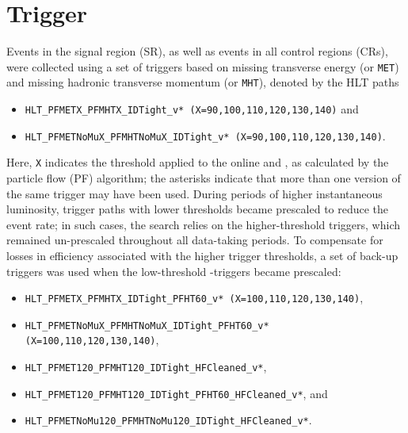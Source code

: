 \clearpage
\section{Trigger}
\label{sec:trigger}

Events in the signal region (SR), as well as events in all control regions (CRs), were collected using a set of triggers based on missing transverse energy \MET (or {\tt MET}) and missing hadronic transverse momentum \mht (or {\tt MHT}), denoted by the HLT paths 

\begin{itemize}
\item
  \texttt{HLT\_PFMETX\_PFMHTX\_IDTight\_v* (X=90,100,110,120,130,140)} and
\item \texttt{HLT\_PFMETNoMuX\_PFMHTNoMuX\_IDTight\_v* (X=90,100,110,120,130,140)}.
\end{itemize}

Here, \texttt{X} indicates the threshold applied to the online
\MET and \mht, as calculated by the particle flow (PF) algorithm; the
asterisks indicate that more than one version of the same trigger may
have been used.  During periods of higher instantaneous luminosity,
trigger paths with lower thresholds  became prescaled to reduce the
event rate; in such cases, the search relies on the higher-threshold
triggers, which remained un-prescaled throughout all data-taking periods. 
To compensate for losses in efficiency associated with the higher trigger thresholds,  
a set of back-up triggers was used when the  low-threshold \MET-\mht triggers 
became prescaled:

\begin{itemize}
\item \texttt{HLT\_PFMETX\_PFMHTX\_IDTight\_PFHT60\_v* (X=100,110,120,130,140)},
\item \texttt{HLT\_PFMETNoMuX\_PFMHTNoMuX\_IDTight\_PFHT60\_v* (X=100,110,120,130,140)},
\item \texttt{HLT\_PFMET120\_PFMHT120\_IDTight\_HFCleaned\_v*},
\item \texttt{HLT\_PFMET120\_PFMHT120\_IDTight\_PFHT60\_HFCleaned\_v*}, and
\item \texttt{HLT\_PFMETNoMu120\_PFMHTNoMu120\_IDTight\_HFCleaned\_v*}.
\end{itemize}

